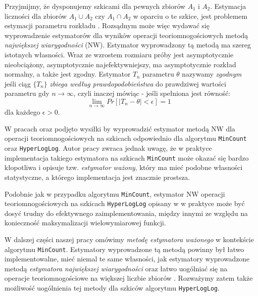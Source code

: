        Przyjmijmy, że dysponujemy szkicami dla pewnych zbiorów $A_1$ i $A_2$. Estymacja liczności dla zbiorów $A_1 \cup A_2$ czy 
       $A_1 \cap A_2$ w oparciu o te szkice, jest problemem estymacji parametru rozkładu \cite{ting}. Rozsądnym może więc wydawać się wyprowadzenie estymatorów dla wyników operacji teoriomnogościowych metodą \textit{największej wiarygodności} (NW).
       Estymator wyprowadzony tą metodą ma szereg istotnych własności. Wraz ze wzrostem rozmiaru próby jest asymptotycznie nieobciążony, asymptotycznie najefektywniejszy, ma asymptotycznie rozkład normalny, a także jest zgodny. Estymator $T_n$ parametru $\theta$ nazywamy \textit{zgodnym} jeśli ciąg $\{T_n\}$ \textit{zbiega według prawdopodobieństwa} 
        do prawdziwej wartości parametru gdy $n \rightarrow \infty$, czyli inaczej mówiąc - jeśli spełniona jest równość:
       \begin{equation}
     		\lim_{n \to \infty} Pr[|T_n - \theta| < \epsilon] = 1
     		\label{consistent_def}
       \end{equation}
       dla każdego $\epsilon > 0$.
%      
      
      W pracach \cite{ting} oraz \cite{oertl} podjęto wysiłki
      by wyprowadzić estymator metodą NW dla operacji teoriomnogościowych na szkicach odpowiednio dla algorytmu \texttt{MinCount} oraz \texttt{HyperLogLog}.
      Autor pracy \cite{ting} zwraca jednak uwagę, że
      w praktyce implementacja takiego estymatora na szkicach \texttt{MinCount} może okazać się bardzo kłopotliwa i opisuje tzw. \textit{estymator ważony}, który ma  mieć podobne własności statystyczne, a którego implementacja jest znacznie prostsza. 
  
 Podobnie jak w przypadku algorytmu \texttt{MinCount}, estymator NW operacji teoriomnogościowych na szkicach \texttt{HyperLogLog} opisany w 
 \cite{oertl} w praktyce może być dosyć trudny do efektywnego zaimplementowania, między innymi ze względu na konieczność maksymalizacji wielowymiarowej funkcji.
       
        W dalszej części naszej pracy omówimy  \textit{metodę estymatora ważonego} w kontekście algorytmu 
        \texttt{MinCount}. 
        Estymatory wyprowadzone tą metodą powinny był łatwo implementowalne, mieć niemal te same własności, jak estymatory wyprowadzone metodą \textit{estymatora największej wiarygodności} oraz łatwo uogólniać się na operacje teoriomnogościowe na większej liczbie zbiorów \cite{ting}.         
        Rozważymy zatem także  możliwość uogólnienia tej metody  dla szkiców algorytmu \texttt{HyperLogLog}.
        
        

       
       
       
